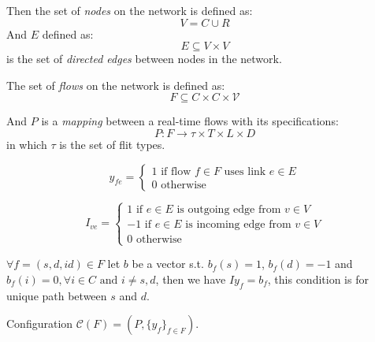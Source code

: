 \documentclass[10pt]{article}
\begin{document}
Then the set of {\em nodes} on the network is defined as:
\begin{equation}\label{reio}
V = C \cup R
\end{equation}
And $E$ defined as:
\begin{equation}
E \subseteq V \times V 
\end{equation}
is the set of {\em directed edges} between nodes in the network.

The set of {\em flows} on the network is defined as:
\begin{equation}
F \subseteq C \times C \times \mathcal{V} 
\end{equation}

And $P$ is a {\em mapping } between a real-time flows with its specifications:
\begin{equation}
P:F \rightarrow \tau \times T \times L \times D
\end{equation}
in which $\tau$ is the set of flit types.

\begin{equation}
y_{fe} = \left\{ \begin{array}{lrc}
1 \mbox{ if flow } f \in F \mbox{ uses link } e \in E \\
0 \mbox{ otherwise} 
\end{array}\right.
\end{equation}

\begin{equation}
I_{ve} = \left\{ \begin{array}{lrc}
1 \mbox{ if } e \in E \mbox{ is outgoing edge from } v \in V \\
-1 \mbox{ if } e \in E \mbox{ is incoming edge from } v \in V \\
0 \mbox{ otherwise}
\end{array}\right. 
\end{equation}

$\forall f=(s, d, id) \in F$  let $b$ be a vector s.t. $b_f(s) = 1$, 
$b_f(d) = -1$ and $b_f(i) = 0, \forall i \in C \mbox{ and } i \neq s, d$,
 then we have $Iy_f=b_f$, this condition is for unique path between $s$ and $d$.

Configuration $\mathcal{C}(F)=(P, \{y_f\}_{f \in F})$.
\end{document}
